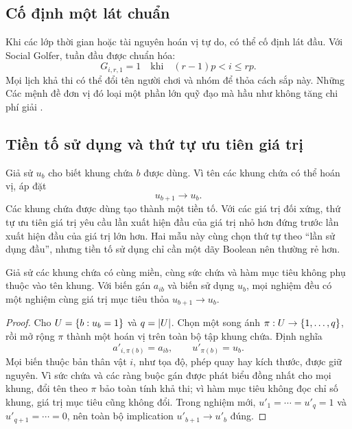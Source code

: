 \subsection{Cố định một lát chuẩn}

Khi các lớp thời gian hoặc tài nguyên hoán vị tự do, có thể cố định lát đầu.
Với Social Golfer, tuần đầu được chuẩn hóa:
\[
  G_{i,r,1}=1
  \quad\text{khi}\quad
  (r-1)p<i\le rp.
\]
Mọi lịch khả thi có thể đổi tên người chơi và nhóm để thỏa cách sắp này. Những
Các mệnh đề đơn vị đó loại một phần lớn quỹ đạo mà hầu như không tăng chi phí giải
\parencite{kieu2026golfer}.

\subsection{Tiền tố sử dụng và thứ tự ưu tiên giá trị}

Giả sử \(u_b\) cho biết khung chứa \(b\) được dùng. Vì tên các khung chứa có thể hoán vị,
áp đặt
\[
  u_{b+1}\rightarrow u_b.
\]
Các khung chứa được dùng tạo thành một tiền tố. Với các giá trị đối xứng, thứ
tự ưu tiên giá trị yêu cầu lần xuất hiện đầu của giá trị nhỏ hơn đứng trước lần
xuất hiện đầu của giá trị lớn hơn. Hai mẫu này cùng chọn thứ tự theo ``lần sử
dụng đầu'', nhưng tiền tố sử dụng chỉ cần một dãy Boolean nên thường rẻ hơn.

\begin{proposition}
\label{prop:usage-prefix}
Giả sử các khung chứa có cùng miền, cùng sức chứa và hàm mục tiêu không phụ
thuộc vào tên khung. Với biến gán \(a_{ib}\) và biến sử dụng \(u_b\), mọi
nghiệm đều có một nghiệm cùng giá trị mục tiêu thỏa
\(u_{b+1}\rightarrow u_b\).
\end{proposition}

\begin{proof}
Cho \(U=\left\{b:u_b=1\right\}\) và \(q=\lvert U\rvert\). Chọn một song ánh
\(\pi:U\to\left\{1,\ldots,q\right\}\), rồi mở rộng \(\pi\) thành một hoán vị trên toàn
bộ tập khung chứa. Định nghĩa
\[
  a'_{i,\pi(b)}=a_{ib},
  \qquad
  u'_{\pi(b)}=u_b .
\]
Mọi biến thuộc bản thân vật \(i\), như tọa độ, phép quay hay kích thước, được
giữ nguyên. Vì sức chứa và các ràng buộc gán được phát biểu đồng nhất cho mọi
khung, đổi tên theo \(\pi\) bảo toàn tính khả thi; vì hàm mục tiêu không đọc
chỉ số khung, giá trị mục tiêu cũng không đổi. Trong nghiệm mới,
\(u'_1=\cdots=u'_q=1\) và \(u'_{q+1}=\cdots=0\), nên toàn bộ implication
\(u'_{b+1}\rightarrow u'_b\) đúng.
\end{proof}

